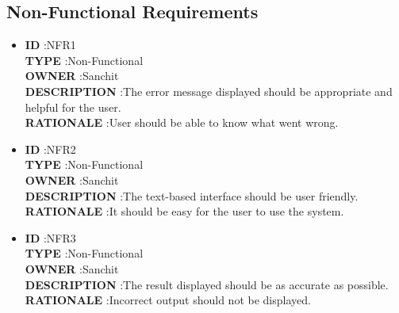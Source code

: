 \documentclass[a4paper,12pt]{article}
\begin{document}
\subsection{Non-Functional Requirements}
\begin{itemize}
	
	\item \textbf{ID } \hspace{3cm} :NFR1  \\
	\textbf{TYPE } \hspace{2.27cm}  :Non-Functional\\
	\textbf{OWNER } \hspace{1.75cm} :Sanchit \\
	\textbf{DESCRIPTION }\hspace{0.35cm} :The error message displayed should be appropriate and helpful for the user. \\
	\textbf{RATIONALE } \hspace{0.75cm} :User should be able to know what went wrong.  \\
	
	
	\item \textbf{ID } \hspace{3cm} :NFR2  \\
	\textbf{TYPE } \hspace{2.27cm}  :Non-Functional\\
	\textbf{OWNER } \hspace{1.75cm} :Sanchit \\
	\textbf{DESCRIPTION }\hspace{0.35cm} :The text-based interface should be user friendly. \\
	\textbf{RATIONALE } \hspace{0.75cm} :It should be easy for the user to use the system.  \\
	
	
	\item \textbf{ID } \hspace{3cm} :NFR3  \\
	\textbf{TYPE } \hspace{2.27cm}  :Non-Functional\\
	\textbf{OWNER } \hspace{1.75cm} :Sanchit \\
	\textbf{DESCRIPTION }\hspace{0.35cm} :The result displayed should be as accurate as possible. \\
	\textbf{RATIONALE } \hspace{0.75cm} :Incorrect output should not be displayed.   \\
	

\end{itemize}
\end{document}
